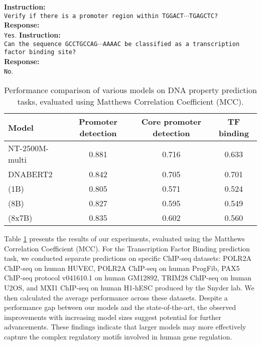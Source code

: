 \begin{example}
\textbf{Instruction:}\\
\texttt{Verify if there is a promoter region within \dna{}TGGACT$\cdots$TGAGCTC\edna{}?}  \\
\textbf{Response:} \\
\texttt{Yes}.
\newline
\newline
\noindent\textbf{Instruction:} \\
\texttt{Can the sequence \dna{}GCCTGCCAG$\cdots$AAAAC\edna{} be classified as a transcription factor binding site?}  \\
\textbf{Response:} \\
\texttt{No}. 
\end{example}

\begin{table}[!h]
\centering
\begin{tabular}{lccc}
         \toprule
         Model & Promoter detection & Core promoter detection & TF binding\\
         \midrule
         NT-2500M-multi \cite{dalla2023nucleotide} & 0.881 & 0.716 & 0.633 \\
         DNABERT2 \cite{zhou2023dnabert} & 0.842 & 0.705 & 0.701 \\
         \midrule
         \ourM{} (1B) & 0.805 & 0.571 & 0.524 \\
         \ourM{} (8B) & 0.827 & 0.595 & 0.549 \\
         \ourM{} (8x7B) & 0.835 & 0.602 & 0.560 \\
         \bottomrule
\end{tabular}
\caption{Performance comparison of various models on DNA property prediction tasks, evaluated using Matthews Correlation Coefficient (MCC).}
\label{tab:DNA:DNA prediction tasks}
\end{table}
Table \ref{tab:DNA:DNA prediction tasks} presents the results of our experiments, evaluated using the Matthews Correlation Coefficient (MCC). For the Transcription Factor Binding prediction task, we conducted separate predictions on specific ChIP-seq datasets: POLR2A ChIP-seq on human HUVEC, POLR2A ChIP-seq on human ProgFib, PAX5 ChIP-seq protocol v041610.1 on human GM12892, TRIM28 ChIP-seq on human U2OS, and MXI1 ChIP-seq on human H1-hESC produced by the Snyder lab. We then calculated the average performance across these datasets. Despite a performance gap between our models and the state-of-the-art, the observed improvements with increasing model sizes suggest potential for further advancements. These findings indicate that larger models may more effectively capture the complex regulatory motifs involved in human gene regulation.

